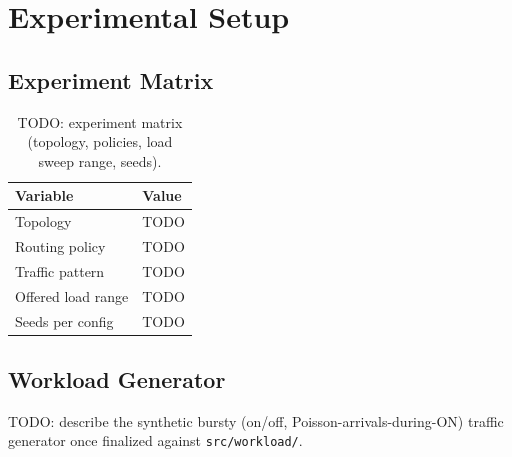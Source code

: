 %

\section{Experimental Setup}
\label{sec:experimental-setup}

\subsection{Experiment Matrix}
\begin{table}[t]
  \centering
  \caption{TODO: experiment matrix (topology, policies, load sweep range, seeds).}
  \label{tab:experiment-matrix}
  \begin{tabular}{ll}
    \toprule
    Variable & Value \\
    \midrule
    Topology & TODO \\
    Routing policy & TODO \\
    Traffic pattern & TODO \\
    Offered load range & TODO \\
    Seeds per config & TODO \\
    \bottomrule
  \end{tabular}
\end{table}

\subsection{Workload Generator}
TODO: describe the synthetic bursty (on/off, Poisson-arrivals-during-ON)
traffic generator once finalized against \texttt{src/workload/}.
